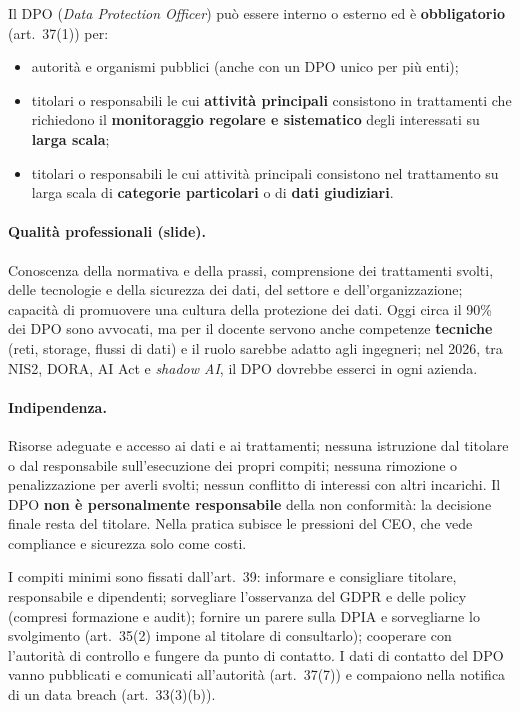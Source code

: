 Il DPO (\emph{Data Protection Officer}) può essere interno o esterno ed è \textbf{obbligatorio}
(art.~37(1)) per:
\begin{itemize}
  \item autorità e organismi pubblici (anche con un DPO unico per più enti);
  \item titolari o responsabili le cui \textbf{attività principali} consistono in trattamenti che
    richiedono il \textbf{monitoraggio regolare e sistematico} degli interessati su \textbf{larga scala};
  \item titolari o responsabili le cui attività principali consistono nel trattamento su larga scala di
    \textbf{categorie particolari} o di \textbf{dati giudiziari}.
\end{itemize}
\paragraph{Qualità professionali (slide).} Conoscenza della normativa e della prassi, comprensione dei
trattamenti svolti, delle tecnologie e della sicurezza dei dati, del settore e dell'organizzazione;
capacità di promuovere una cultura della protezione dei dati. Oggi circa il 90\% dei DPO sono avvocati, ma
per il docente servono anche competenze \textbf{tecniche} (reti, storage, flussi di dati) e il ruolo
sarebbe adatto agli ingegneri; nel 2026, tra NIS2, DORA, AI Act e \emph{shadow AI}, il DPO dovrebbe
esserci in ogni azienda.

\paragraph{Indipendenza.} Risorse adeguate e accesso ai dati e ai trattamenti; nessuna istruzione dal
titolare o dal responsabile sull'esecuzione dei propri compiti; nessuna rimozione o penalizzazione per
averli svolti; nessun conflitto di interessi con altri incarichi. Il DPO \textbf{non è personalmente
responsabile} della non conformità: la decisione finale resta del titolare. Nella pratica subisce le
pressioni del CEO, che vede compliance e sicurezza solo come costi.

\begin{integrazione}
I compiti minimi sono fissati dall'art.~39: informare e consigliare titolare, responsabile e dipendenti;
sorvegliare l'osservanza del GDPR e delle policy (compresi formazione e audit); fornire un parere sulla
DPIA e sorvegliarne lo svolgimento (art.~35(2) impone al titolare di consultarlo); cooperare con
l'autorità di controllo e fungere da punto di contatto. I dati di contatto del DPO vanno pubblicati e
comunicati all'autorità (art.~37(7)) e compaiono nella notifica di un data breach (art.~33(3)(b)).
\end{integrazione}

